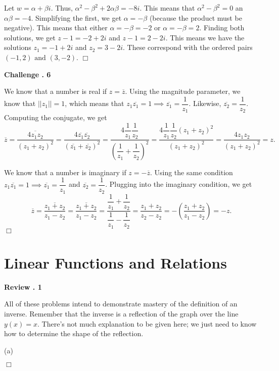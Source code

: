 \documentclass[lang=en,11pt]{elegantbook}
\begin{document}
Let $w=\alpha+\beta i$.  Thus, $\alpha^2-\beta^2+2\alpha\beta=-8i.$  This means that $\alpha^2-\beta^2=0$ an $\alpha\beta=-4$.  Simplifying the first, we get $\alpha=-\beta$ (because the product must be negative).  This means that either $\alpha=-\beta=-2$ or $\alpha=-\beta=2$.  Finding both solutions, we get $z-1=-2+2i$ and $z-1=2-2i$.  This means we have the solutions $z_1=-1+2i$ and $z_2=3-2i$.  These correspond with the ordered pairs $\boxed{(-1,2) \text{ and } (3,-2)}$. $\Box$\vspace{3mm}

\noindent \textbf{Challenge . 6}

We know that a number is real if $z=\overline{z}$.  Using the magnitude parameter, we know that $||z_1||=1$, which means that $z_1\overline{z_1}=1 \implies \overline{z_1}=\dfrac{1}{z_1}$.  Likewise, $\overline{z_2}=\dfrac{1}{z_2}$. Computing the conjugate, we get $$\overline{z}=\overline{\dfrac{4z_1z_2}{\left(z_1+z_2\right)^2}}=\dfrac{4\overline{z_1}\overline{z_2}}{(\overline{z_1}+\overline{z_2})^2}=\dfrac{4\dfrac{1}{z_1}\dfrac{1}{z_2}}{\left(\dfrac{1}{z_1}+\dfrac{1}{z_2}\right)^2}=\dfrac{4\dfrac{1}{z_1}\dfrac{1}{z_2}(z_1+z_2)^2}{(z_1+z_2)^2}=\dfrac{4z_1z_2}{\left(z_1+z_2\right)^2}=\boxed{z}.$$

We know that a number is imaginary if $z=-\overline{z}$.  Using the same condition $z_1\overline{z_1}=1 \implies \overline{z_1}=\dfrac{1}{z_1}$ and $\overline{z_2}=\dfrac{1}{z_2}$.  Plugging into the imaginary condition, we get $$\overline{z}=\overline{\dfrac{z_1+z_2}{z_1-z_2}}=\overline{\dfrac{z_1+z_2}{z_1-z_2}}=\dfrac{\dfrac{1}{z_1}+\dfrac{1}{z_2}}{\dfrac{1}{z_1}-\dfrac{1}{z_2}}=\dfrac{z_1+z_2}{z_2-z_2}=-\left(\dfrac{z_1+z_2}{z_1-z_2}\right)=\boxed{-z}.$$ $\Box$

\chapter{Linear Functions and Relations}

\noindent \textbf{Review . 1}

All of these problems intend to demonstrate mastery of the definition of an inverse.  Remember that the inverse is a reflection of the graph over the line $y(x)=x$.  There's not much explanation to be given here; we just need to know how to determine the shape of the reflection.

(a) \begin{figure}[!h]
    \centering
\end{figure} $\Box$\vspace{3mm}
\end{document}
